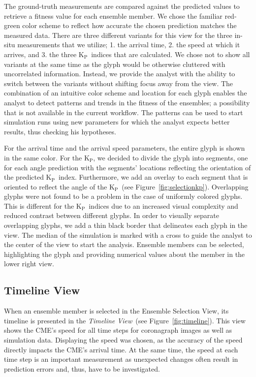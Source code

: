 \documentclass[journal]{vgtc}                %
\newcommand{\kpIndex}{$\textrm{K}_\textrm{P}$}
\begin{document}
The ground-truth measurements are compared against the predicted values to retrieve a fitness value for each ensemble member. We chose the familiar red-green color scheme to reflect how accurate the chosen prediction matches the measured data. There are three different variants for this view for the three in-situ measurements that we utilize; 1. the arrival time, 2. the speed at which it arrives, and 3. the three \kpIndex\ indices that are calculated. We chose not to show all variants at the same time as the glyph would be otherwise cluttered with uncorrelated information. Instead, we provide the analyst with the ability to switch between the variants without shifting focus away from the view. The combination of an intuitive color scheme and location for each glyph enables the analyst to detect patterns and trends in the fitness of the ensembles; a possibility that is not available in the current workflow. The patterns can be used to start simulation runs using new parameters for which the analyst expects better results, thus checking his hypotheses.

For the arrival time and the arrival speed parameters, the entire glyph is shown in the same color. For the \kpIndex , we decided to divide the glyph into segments, one for each angle prediction with the segments' locations reflecting the orientation of the predicted \kpIndex\ index. Furthermore, we add an overlay to each segment that is oriented to reflect the angle of the \kpIndex ~(see Figure~\ref{fig:selectionkp}). Overlapping glyphs were not found to be a problem in the case of uniformly colored glyphs. This is different for the \kpIndex\ indices due to an increased visual complexity and reduced contrast between different glyphs. In order to visually separate overlapping glyphs, we add a thin black border that delineates each glyph in the view. The median of the simulation is marked with a cross to guide the analyst to the center of the view to start the analysis. Ensemble members can be selected, highlighting the glyph and providing numerical values about the member in the lower right view.

\subsection{Timeline View} \label{sec:timeline}
When an ensemble member is selected in the Ensemble Selection View, its timeline is presented in the \emph{Timeline View}~(see Figure~\ref{fig:timeline}). This view shows the CME's speed for all time steps for coronagraph images as well as simulation data. Displaying the speed was chosen, as the accuracy of the speed directly impacts the CME's arrival time. At the same time, the speed at each time step is an important measurement as unexpected changes often result in prediction errors and, thus, have to be investigated.
\end{document}
